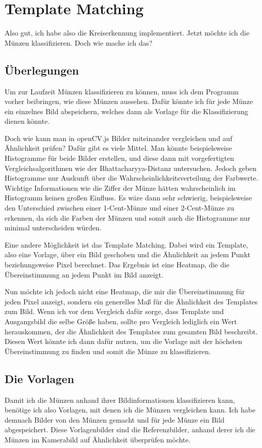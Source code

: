 \section{Template Matching}
Also gut, ich habe also die Kreiserkennung implementiert. Jetzt möchte ich die Münzen klassifizieren. Doch wie mache ich das? 

\subsection{Überlegungen}
Um zur Laufzeit Münzen klassifizieren zu können, muss ich dem Programm vorher beibringen, wie diese Münzen aussehen. Dafür könnte ich für jede Münze ein einzelnes Bild abspeichern, welches dann als Vorlage für die Klassifizierung dienen könnte.

Doch wie kann man in openCV.js Bilder miteinander vergleichen und auf Ähnlichkeit prüfen? Dafür gibt es viele Mittel. Man könnte beispielsweise Histogramme für beide Bilder erstellen, und diese dann mit vorgefertigten Vergleichsalgorithmen wie der Bhattacharyya-Distanz untersuchen. Jedoch geben Histogramme nur Auskunft über die Wahrscheinlichkeitsverteilung der Farbwerte. Wichtige Informationen wie die Ziffer der Münze hätten wahrscheinlich im Histogramm keinen großen Einfluss. Es wäre dann sehr schwierig, beispielsweise den Unterschied zwischen einer 1-Cent-Münze und einer 2-Cent-Münze zu erkennen, da sich die Farben der Münzen und somit auch die Histogramme nur minimal unterscheiden würden.

Eine andere Möglichkeit ist das Template Matching. Dabei wird ein Template, also eine Vorlage, über ein Bild geschoben und die Ähnlichkeit an jedem Punkt beziehungsweise Pixel berechnet. Das Ergebnis ist eine Heatmap, die die Übereinstimmung an jedem Punkt im Bild anzeigt.

Nun möchte ich jedoch nicht eine Heatmap, die mir die Übereinstimmung für jeden Pixel anzeigt, sondern ein generelles Maß für die Ähnlichkeit des Templates zum Bild. Wenn ich vor dem Vergleich dafür sorge, dass Template und Ausgangsbild die selbe Größe haben, sollte pro Vergleich lediglich ein Wert herauskommen, der die Ähnlichkeit des Templates zum gesamten Bild beschreibt. Diesen Wert könnte ich dann dafür nutzen, um die Vorlage mit der höchsten Übereinstimmung zu finden und somit die Münze zu klassifizieren.

\subsection{Die Vorlagen}
Damit ich die Münzen anhand ihrer Bildinformationen klassifizieren kann, benötige ich also Vorlagen, mit denen ich die Münzen vergleichen kann. Ich habe demnach Bilder von den Münzen gemacht und für jede Münze ein Bild abgespeichert. Diese Vorlagenbilder sind die Referenzbilder, anhand derer ich die Münzen im Kamerabild auf Ähnlichkeit überprüfen möchte.

